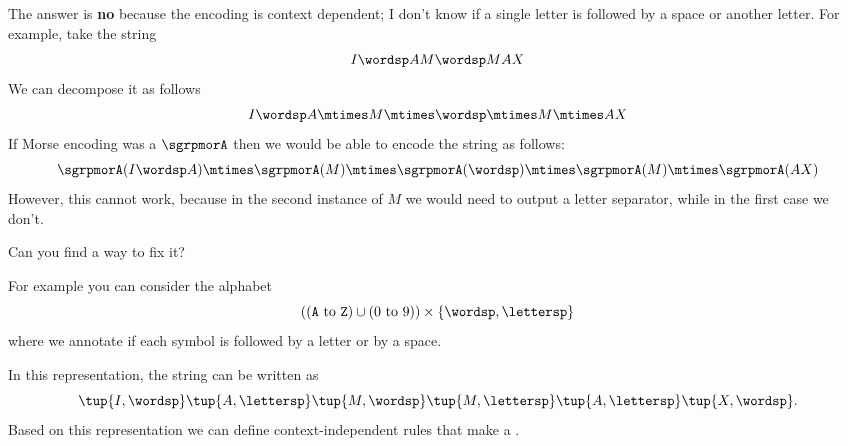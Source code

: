 \begin{solution}
The answer is \textbf{no} because the encoding is context dependent; I don't know if a single letter is followed by a space or another letter.
For example, take the string
    \begin{equation}
    I\wordsp AM\wordsp MAX
    \end{equation}
We can decompose it as follows
\begin{equation}
    I\wordsp A\mtimes M \mtimes \wordsp \mtimes M \mtimes AX
    \end{equation}
If Morse encoding was a \whomo $\sgrpmorA$ then we would be able to encode the string as follows:
\begin{equation}
    \sgrpmorA(I\wordsp A) \mtimes \sgrpmorA (M) \mtimes  \sgrpmorA(\wordsp) \mtimes  \sgrpmorA(M)
     \mtimes  \sgrpmorA(AX)
    \end{equation}
However, this cannot work, because in the second instance of $M$ we would need to output a letter separator, while in the first case we don't.

Can you find a way to fix it?

For example you can consider the alphabet
\begin{equation}
 \left( (\texttt{A} \ \text{to}\ \texttt{Z}) \cup (0 \ \text{to}\ 9) \right) \times \{\wordsp, \lettersp\}
\end{equation}
where we annotate if each symbol is followed by a letter or by a space.

In this representation, the string can be written as
\begin{equation}
 \tup{I, \wordsp} \tup{A, \lettersp} \tup{ M, \wordsp} \tup{M, \lettersp} \tup{A, \lettersp}
  \tup{X, \wordsp}.
\end{equation}
Based on this representation we can define context-independent rules that make a \whomo.
\end{solution}

\begin{example}
\end{example}


\begin{example}
\end{example}


